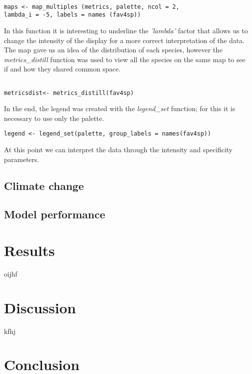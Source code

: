\documentclass[12pt,a4paper]{article}
\begin{document}
\begin{lstlisting}

maps <- map_multiples (metrics, palette, ncol = 2,
lambda_i = -5, labels = names (fav4sp))

\end{lstlisting}
\bigskip
In this function it is interesting to underline the \textit{'lambda'} factor that allows us to change the intensity of the display for a more correct interpretation of the data.\\
The map gave us an idea of the distribution of each species, however the \textit{metrics\_distill} function was used to view all the species on the same map to see if and how they shared common space.
\begin{lstlisting}

metricsdist<- metrics_distill(fav4sp)

\end{lstlisting}
\bigskip
In the end, the legend was created with the \textit{legend\_set} function; for this it is necessary to use only the palette.
\\
\begin{lstlisting}
legend <- legend_set(palette, group_labels = names(fav4sp))

\end{lstlisting}
\bigskip
At this point we can interpret the data through the intensity and specificity parameters.



\subsection{Climate change}
\subsection{Model performance}

\newpage
\section{Results}
oijhf

\newpage
\section{Discussion}
kfhj

\newpage
\section{Conclusion}
\end{document}
